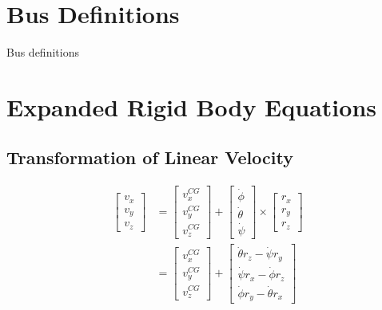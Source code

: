 \chapter{Bus Definitions}
Bus definitions

\chapter{Expanded Rigid Body Equations}
\section{Transformation of Linear Velocity}\label{sec:appendix-transformation-linvel}
\begin{align*}%
\begin{bmatrix}v_x \\ v_y \\ v_z\end{bmatrix}%
&=\begin{bmatrix}v_{x}^{CG} \\ v_{y}^{CG} \\ v_{z}^{CG}\end{bmatrix}%
+\begin{bmatrix}\dot{\phi} \\ \dot{\theta} \\ \dot{\psi}\end{bmatrix}\times\begin{bmatrix}r_x \\ r_y \\ r_z\end{bmatrix} \\%
&=\begin{bmatrix}v_{x}^{CG} \\ v_{y}^{CG} \\ v_{z}^{CG}\end{bmatrix}%
+\begin{bmatrix}\dot{\theta}r_z - \dot{\psi}r_y \\\dot{\psi}r_x - \dot{\phi}r_z \\\dot{\phi}r_y - \dot{\theta}r_x\end{bmatrix}%
\end{align*}

